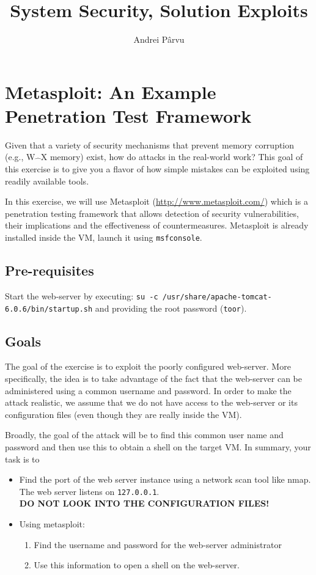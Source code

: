 \documentclass[a4paper,11pt]{article}
\title{System Security,
\ifsolution Solution \else \fi
Exploits}
\author{Andrei Pârvu}
\begin{document}
\maketitle
\section{Metasploit: An Example Penetration Test Framework}
Given that a variety of security mechanisms that prevent memory
corruption (e.g., W$\hat{\mbox{ }}$X memory) exist, how do attacks in the
real-world work? This goal of this exercise is to give you a flavor of how
simple mistakes can be exploited using readily available tools. 

In this exercise, we will use Metasploit
(\url{http://www.metasploit.com/}) which is a penetration testing
framework that allows detection of security vulnerabilities, their
implications and the effectiveness of countermeasures. Metasploit is already
installed inside the VM, launch it using \texttt{msfconsole}.

\subsection{Pre-requisites}
Start the web-server by executing: 
\verb|su -c /usr/share/apache-tomcat-6.0.6/bin/startup.sh|
and providing the root password (\texttt{toor}).

\subsection{Goals}
The goal of the exercise is to exploit the poorly configured
web-server. More specifically, the idea is to take advantage
of the fact that the web-server can be administered using a common
username and password. In order to make the attack realistic, we
assume that we do not have access to the web-server or its configuration files
(even though they are really inside the VM).
  
Broadly, the goal of the attack will be to find this common user
name and password and then use this to obtain a shell on the target
VM. In summary, your task is to

\begin{itemize}
\item Find the port of the web server instance using a network scan tool like
nmap. The web server listens on \texttt{127.0.0.1}.\\
\textbf{DO NOT LOOK INTO THE CONFIGURATION FILES!}
\item Using metasploit:
  \begin{enumerate}
  \item Find the username and password for the web-server
    administrator
  \item Use this information to open a shell on the web-server.
  \end{enumerate}
\end{itemize}
\end{document}
